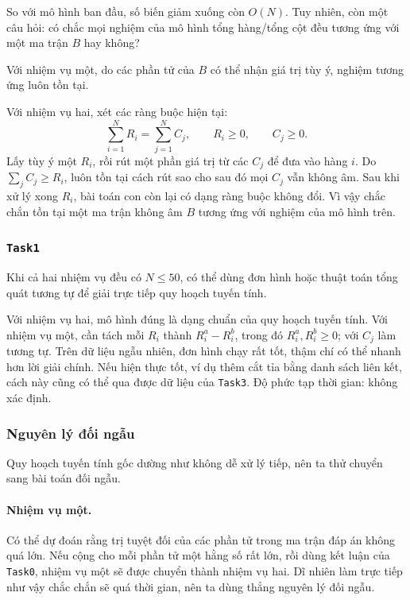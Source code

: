 \documentclass[11pt]{article}
\begin{document}
So với mô hình ban đầu, số biến giảm xuống còn \(O(N)\). Tuy nhiên, còn một câu
hỏi: có chắc mọi nghiệm của mô hình tổng hàng/tổng cột đều tương ứng với một ma
trận \(B\) hay không?

Với nhiệm vụ một, do các phần tử của \(B\) có thể nhận giá trị tùy ý, nghiệm
tương ứng luôn tồn tại.

Với nhiệm vụ hai, xét các ràng buộc hiện tại:
\[
  \sum_{i=1}^{N}R_i=\sum_{j=1}^{N}C_j,\qquad
  R_i\ge0,\qquad C_j\ge0.
\]
Lấy tùy ý một \(R_i\), rồi rút một phần giá trị từ các \(C_j\) để đưa vào hàng
\(i\). Do \(\sum_j C_j\ge R_i\), luôn tồn tại cách rút sao cho sau đó mọi
\(C_j\) vẫn không âm. Sau khi xử lý xong \(R_i\), bài toán con còn lại có dạng
ràng buộc không đổi. Vì vậy chắc chắn tồn tại một ma trận không âm \(B\) tương
ứng với nghiệm của mô hình trên.

\subsubsection{\texttt{Task1}}

Khi cả hai nhiệm vụ đều có \(N\le 50\), có thể dùng đơn hình hoặc thuật toán
tổng quát tương tự để giải trực tiếp quy hoạch tuyến tính.

Với nhiệm vụ hai, mô hình đúng là dạng chuẩn của quy hoạch tuyến tính. Với nhiệm
vụ một, cần tách mỗi \(R_i\) thành \(R^a_i-R^b_i\), trong đó
\(R^a_i,R^b_i\ge0\); với \(C_j\) làm tương tự. Trên dữ liệu ngẫu nhiên, đơn hình
chạy rất tốt, thậm chí có thể nhanh hơn lời giải chính. Nếu hiện thực tốt, ví dụ
thêm cắt tỉa bằng danh sách liên kết, cách này cũng có thể qua được dữ liệu của
\texttt{Task3}. Độ phức tạp thời gian: không xác định.

\subsubsection{Nguyên lý đối ngẫu}

Quy hoạch tuyến tính gốc dường như không dễ xử lý tiếp, nên ta thử chuyển sang
bài toán đối ngẫu.

\paragraph{Nhiệm vụ một.}
Có thể dự đoán rằng trị tuyệt đối của các phần tử trong ma trận đáp án không
quá lớn. Nếu cộng cho mỗi phần tử một hằng số rất lớn, rồi dùng kết luận của
\texttt{Task0}, nhiệm vụ một sẽ được chuyển thành nhiệm vụ hai. Dĩ nhiên làm
trực tiếp như vậy chắc chắn sẽ quá thời gian, nên ta dùng thẳng nguyên lý đối
ngẫu.
\end{document}
